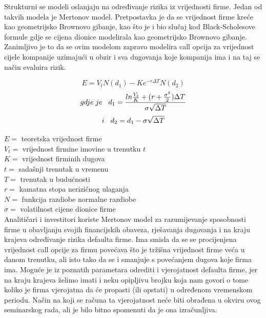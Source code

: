 \documentclass[times, utf8, seminar]{fer}
\begin{document}
Strukturni se modeli oslanjaju na određivanje rizika iz vrijednosti firme. Jedan od takvih modela je Mertonov model. Pretpostavka je da se vrijednost firme kreće kao geometrijsko Brownovo gibanje, kao što je i bio slučaj kod Black-Scholesove formule gdje se cijena dionice modelirala kao geometrijsko Brownovo gibanje.
Zanimljivo je to da se ovim modelom zapravo modelira call opcija za vrijednost cijele kompanije uzimajući u obzir i sva dugovanja koje kompanija ima i na taj se način evaluira rizik.

\[ E = V_tN(d_1) - K e^{-r\Delta T}N(d_2)\]
\[ gdje \hspace{0.1cm} je \hspace{0.3cm} d_1 = \frac{ln \frac{V_t}{K} + (r+\frac{\sigma^2}{2})\Delta T}{\sigma\sqrt{\Delta T}} \]
\[ i \hspace{0.3cm} d_2 = d_1 - \sigma\sqrt{\Delta T}\]

\noindent $E =$ teoretska vrijednost firme \\
$V_t =$ vrijednost firmine imovine u trenutku $t$\\
$K =$ vrijednost firminih dugova\\
$t =$ sadašnji trenutak u vremenu\\
$T =$ trenutak u budućnosti\\
$r =$ kamatna stopa nerizičnog ulaganja\\
$N =$ funkcija razdiobe normalne razdiobe\\
$\sigma =$ volatilnost cijene dionice firme\\

Analitičari i investitori koriste Mertonov model za razumijevanje sposobnosti firme u obavljanju svojih financijskih obaveza, rješavanja dugovanja i na kraju krajeva određivanje rizika defaulta firme. Ima smisla da se se procijenjena vrijednost call opcije za firmu povećava što je tržišna vrijednost firme veća u danom trenutku, ali isto tako da se i smanjuje s povećanjem dugova koje firma ima. Moguće je iz poznatih parametara odrediti i vjerojatnost defaulta firme, jer na kraju krajeva želimo imati i neku opipljivu brojku koja nam govori o tome koliko je firma vjerojatna da će propasti (ili opstati) u određenom vremenskom periodu. Način na koji se računa ta vjerojatnost neće biti obrađena u okviru ovog seminarskog rada, ali je bilo bitno spomenuti da je ona izračunljiva.
\end{document}
